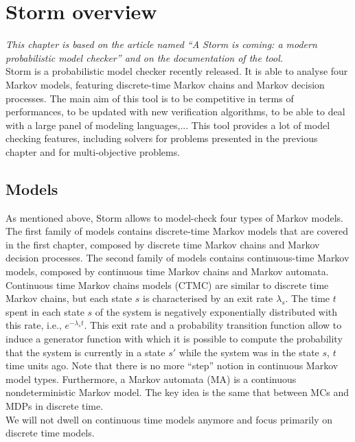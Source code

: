 \chapter{Storm overview}
\textit{This chapter is based on the article named ``A Storm is coming: a modern probabilistic model checker'' \cite{storm1} and on the documentation of the tool.} \\

Storm is a probabilistic model checker recently released. It is able to analyse
four Markov models, featuring discrete-time Markov chains and Markov decision processes. The main aim of this tool is to be competitive in terms of performances, to be updated with new verification algorithms, to be able to
deal with a large panel of modeling languages,... This tool provides %
a lot of model checking features, including solvers for problems presented in the previous chapter and
for multi-objective problems.

\section{Models}
As mentioned above, Storm allows to model-check four types of Markov models.
The first family of models contains discrete-time Markov models that are covered in the first chapter, composed by
discrete time Markov chains and Markov decision processes.
The second family of models contains continuous-time Markov models, composed by continuous time Markov chains and Markov automata. \\

Continuous time Markov chains models (CTMC) \cite{maro} are similar to discrete time Markov chains, but each state $s$ is
characterised by an exit rate $\lambda_s$.
The time $t$ spent in each state $s$ of the system is negatively exponentially distributed with this rate, i.e., $e^{- \lambda_s t}$.
This exit rate and a probability transition function allow to induce a generator
function with which it is possible to compute the probability
that the system is currently in a state $s'$ while the system was in the state $s$, $t$ time units ago. Note that there is no more ``step'' notion in continuous
Markov model types. Furthermore, a Markov automata (MA) is a continuous nondeterministic Markov model. The key idea is the same that between MCs and MDPs in discrete time. \\

We will not dwell on continuous time models anymore and focus primarily on discrete time models.

